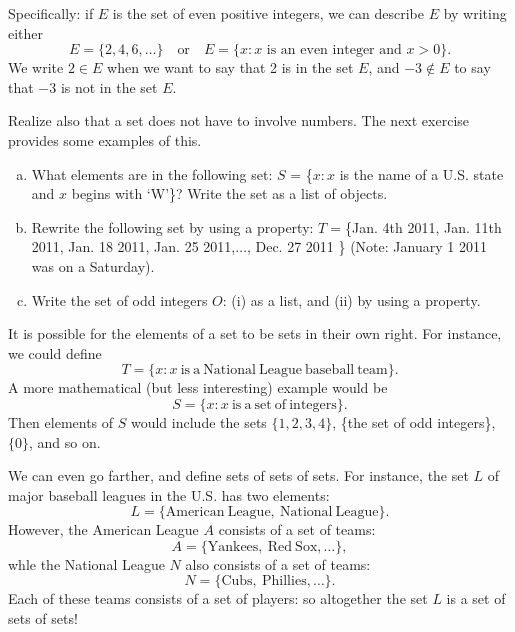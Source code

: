 Specifically: if $E$ is the set of even positive integers, we can describe $E$ by writing either 
\[
E = \{2, 4, 6, \ldots \}
\quad \text{or} \quad
E = \{ x : x \text{ is an even integer and } x > 0 \}.
\]
We write $2 \in E$ when we want to say that 2 is in the set $E$, and $-3 \notin E$ to say that $-3$ is not in the set $E$.

Realize also that a set does not have to involve numbers.  The next exercise provides some examples of this.

\begin{exercise}
\begin{enumerate}[(a)]
\item
What elements are in the following set:  $S$ = \{$x : x$ is the name of a U.S. state and $x$ begins with `W'\}?  Write the set as a list of objects.
\item
Rewrite the following set by using a property:  $T = $\{Jan. 4th  2011, Jan. 11th  2011, Jan. 18  2011, Jan. 25  2011,$ \ldots$, Dec. 27 2011 \} (Note: January 1 2011 was on a Saturday).
\item
Write the set of odd integers $O$: (i) as a list, and (ii) by using a property.
\end{enumerate}
\end{exercise}

It is possible for the elements of a set to be sets in their own right. For instance,  we could define
\[T = \{ x : x \mathrm{~is~a~National~League~baseball~team} \}. \]
A more mathematical (but less interesting) example would be
\[S = \{ x : x \mathrm{~is~a~set~of~integers} \}. \]
Then elements of $S$ would include the sets $\{1,2,3,4\}$, \{the set of odd integers\}, $\{ 0 \}$, and so on. 

We can even go farther, and define sets of sets of sets. For instance, the set $L$ of major baseball leagues in the U.S. has two elements: 
\[L = \{ \mathrm{American~League,~National~League} \}. \]
However, the American League $A$ consists of a set of teams:
\[A = \{ \mathrm{Yankees,~Red~Sox,} \ldots \}, \]
whle the National League $N$ also consists of a set of teams:
\[N = \{ \mathrm{Cubs,~Phillies,} \ldots \}. \]
Each of these teams consists of a set of players: so altogether the set $L$ is a set of sets of sets!


